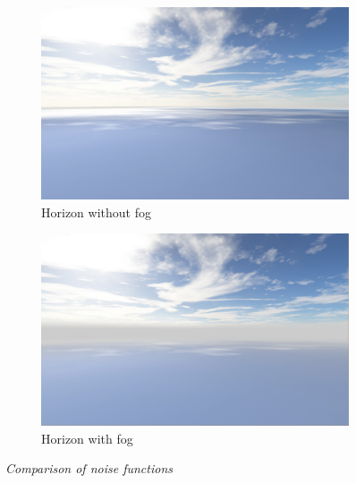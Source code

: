 \begin{figure}[H]
\begin{subfigure}{.5\textwidth}
  \centering
  \includegraphics[width=0.9\linewidth]{images/horizonNoFog.png}
  \caption{Horizon without fog}
  \label{fig:HorizonNoFog}
\end{subfigure}%
\begin{subfigure}{.5\textwidth}
  \centering
  \includegraphics[width=0.9\linewidth]{images/horizonFog.png}
  \caption{Horizon with fog}
  \label{fig:HorizonFog}
\end{subfigure}
\caption[Noise comparison]{\textit{Comparison of noise functions}}
\label{fig:HorizonFogComparison}
\end{figure}


